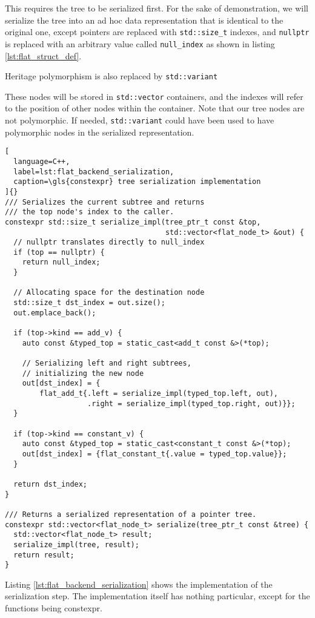 \documentclass[../main]{subfiles}
\begin{document}
This requires the tree to be serialized first.
For the sake of demonstration, we will serialize the tree into an ad hoc
data representation that is identical to the original one, except pointers
are replaced with \lstinline{std::size_t} indexes, and \lstinline{nullptr}
is replaced with an arbitrary value called \lstinline{null_index} as shown in
listing \ref{lst:flat_struct_def}.

Heritage polymorphism is also replaced by \lstinline{std::variant}

These nodes will be stored in \lstinline{std::vector} containers,
and the indexes will refer to the position of other nodes within the container.
Note that our tree nodes are not polymorphic. If needed,
\lstinline{std::variant} could have been used to have polymorphic nodes in
the serialized representation.

\begin{lstlisting}[
  language=C++,
  label=lst:flat_backend_serialization,
  caption=\gls{constexpr} tree serialization implementation
]{}
/// Serializes the current subtree and returns
/// the top node's index to the caller.
constexpr std::size_t serialize_impl(tree_ptr_t const &top,
                                     std::vector<flat_node_t> &out) {
  // nullptr translates directly to null_index
  if (top == nullptr) {
    return null_index;
  }

  // Allocating space for the destination node
  std::size_t dst_index = out.size();
  out.emplace_back();

  if (top->kind == add_v) {
    auto const &typed_top = static_cast<add_t const &>(*top);

    // Serializing left and right subtrees,
    // initializing the new node
    out[dst_index] = {
        flat_add_t{.left = serialize_impl(typed_top.left, out),
                   .right = serialize_impl(typed_top.right, out)}};
  }

  if (top->kind == constant_v) {
    auto const &typed_top = static_cast<constant_t const &>(*top);
    out[dst_index] = {flat_constant_t{.value = typed_top.value}};
  }

  return dst_index;
}

/// Returns a serialized representation of a pointer tree.
constexpr std::vector<flat_node_t> serialize(tree_ptr_t const &tree) {
  std::vector<flat_node_t> result;
  serialize_impl(tree, result);
  return result;
}
\end{lstlisting}

Listing \ref{lst:flat_backend_serialization} shows the implementation of the
serialization step. The implementation itself has nothing particular, except for
the functions being \gls{constexpr}.
\end{document}

